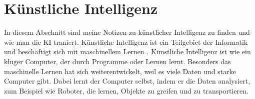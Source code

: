 \section{Künstliche Intelligenz}
\label{sec:ai}

In diesem Abschnitt sind meine Notizen zu künstlicher Intelligenz zu finden und wie man die KI traniert.
\newline
Künstliche Intelligenz ist ein Teilgebiet der Informatik und beschäftigt sich mit maschinellem Lernen \citep{ai-wikipedia}.
\newline
Künstliche Intelligenz ist wie ein kluger Computer, der durch Programme oder Lernen lernt. Besonders das maschinelle Lernen hat sich weiterentwickelt, weil es viele Daten und starke Computer gibt. Dabei lernt der Computer selbst, indem er die Daten analysiert, zum Beispiel wie Roboter, die lernen, Objekte zu greifen und zu transportieren.